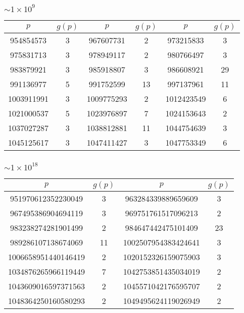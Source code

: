 \subsubsection{$\sim 1 \times 10^9$}

  \begin{tabular}{|c|c|c|c|c|c|}
  \hline
  $p$ & $g(p)$ & $p$ & $g(p)$ & $p$ & $g(p)$ \\ \hline
954854573 & 3 & 967607731 & 2 & 973215833 & 3 \\
975831713 & 3 & 978949117 & 2 & 980766497 & 3 \\
983879921 & 3 & 985918807 & 3 & 986608921 & 29 \\
991136977 & 5 & 991752599 & 13 & 997137961 & 11 \\
1003911991 & 3 & 1009775293 & 2 & 1012423549 & 6 \\
1021000537 & 5 & 1023976897 & 7 & 1024153643 & 2 \\
1037027287 & 3 & 1038812881 & 11 & 1044754639 & 3 \\
1045125617 & 3 & 1047411427 & 3 & 1047753349 & 6 \\
  \hline
  \end{tabular}

\subsubsection{$\sim 1 \times 10^{18}$}

  \begin{tabular}{|c|c|c|c|}
  \hline
  $p$ & $g(p)$ & $p$ & $g(p)$ \\ \hline
951970612352230049 & 3 & 963284339889659609 & 3 \\
967495386904694119 & 3 & 969751761517096213 & 2 \\
983238274281901499 & 2 & 984647442475101409 & 23 \\
989286107138674069 & 11 & 1002507954383424641 & 3 \\
1006658951440146419 & 2 & 1020152326159075903 & 3 \\
1034876265966119449 & 7 & 1042753851435034019 & 2 \\
1043609016597371563 & 2 & 1045571042176595707 & 2 \\
1048364250160580293 & 2 & 1049495624119026949 & 2 \\
  \hline
  \end{tabular}




